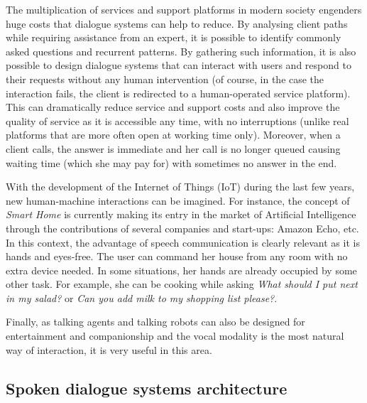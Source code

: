         The multiplication of services and support platforms in modern society engenders huge costs that dialogue systems can help to reduce. By analysing client paths while requiring assistance from an expert, it is possible to identify commonly asked questions and recurrent patterns. By gathering such information, it is also possible to design dialogue systems that can interact with users and respond to their requests without any human intervention (of course, in the case the interaction fails, the client is redirected to a human-operated service platform). This can dramatically reduce service and support costs and also improve the quality of service as it is accessible any time, with no interruptions (unlike real platforms that are more often open at working time only). Moreover, when a client calls, the answer is immediate and her call is no longer queued causing waiting time (which she may pay for) with sometimes no answer in the end.

        With the development of the Internet of Things (IoT) during the last few years, new human-machine interactions can be imagined. For instance, the concept of \textit{Smart Home} is currently making its entry in the market of Artificial Intelligence through the contributions of several companies and start-ups: Amazon Echo, etc. In this context, the advantage of speech communication is clearly relevant as it is hands and eyes-free. The user can command her house from any room with no extra device needed. In some situations, her hands are already occupied by some other task. For example, she can be cooking \cite{Laroche2013} while asking \textit{What should I put next in my salad?} or \textit{Can you add milk to my shopping list please?}.

        Finally, as talking agents and talking robots can also be designed for entertainment and companionship \cite{Sidner2013} and the vocal modality is the most natural way of interaction, it is very useful in this area.
        
        \subsection{Spoken dialogue systems architecture}
        \label{soa:architecture}

